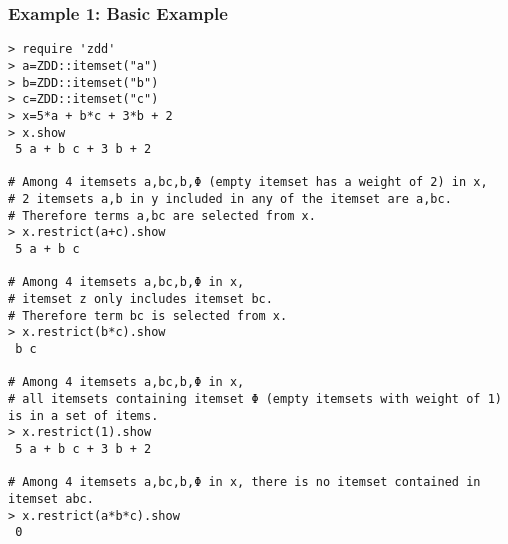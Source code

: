\subsubsection*{Example 1: Basic Example}



\begin{Verbatim}[baselinestretch=0.7,frame=single]
> require 'zdd'
> a=ZDD::itemset("a")
> b=ZDD::itemset("b")
> c=ZDD::itemset("c")
> x=5*a + b*c + 3*b + 2
> x.show
 5 a + b c + 3 b + 2

# Among 4 itemsets a,bc,b,Φ (empty itemset has a weight of 2) in x,  
# 2 itemsets a,b in y included in any of the itemset are a,bc. 
# Therefore terms a,bc are selected from x.
> x.restrict(a+c).show
 5 a + b c

# Among 4 itemsets a,bc,b,Φ in x, 
# itemset z only includes itemset bc.
# Therefore term bc is selected from x.
> x.restrict(b*c).show
 b c

# Among 4 itemsets a,bc,b,Φ in x,  
# all itemsets containing itemset Φ (empty itemsets with weight of 1) is in a set of items.
> x.restrict(1).show
 5 a + b c + 3 b + 2

# Among 4 itemsets a,bc,b,Φ in x, there is no itemset contained in itemset abc.
> x.restrict(a*b*c).show
 0
\end{Verbatim}
